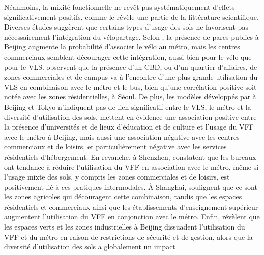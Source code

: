 \begin{refsegment}
Néanmoins, la mixité fonctionnelle ne revêt pas systématiquement d'effets significativement positifs, comme le révèle une partie de la littérature scientifique. Diverses études suggèrent que certains types d'usage des sols ne favorisent pas nécessairement l'intégration du vélopartage. Selon \textcolor{blue}{\textcite[56]{zhao_bicycle-metro_2017}}, la présence de parcs publics à Beijing augmente la probabilité d'associer le vélo au métro, mais les centres commerciaux semblent décourager cette intégration, aussi bien pour le vélo que pour le \acrshort{VLS}. \textcolor{blue}{\textcite[9]{kim_analysis_2021}} observent que la présence d'un \acrfull{CBD}, ou d'un quartier d'affaires, de zones commerciales et de campus va à l'encontre d'une plus grande utilisation du \acrshort{VLS} en combinaison avec le métro et le bus, bien qu'une corrélation positive soit notée avec les zones résidentielles, à Séoul. De plus, les modèles développés par \textcolor{blue}{\textcite[214]{lin_built_2018}} à Beijing et Tokyo n'indiquent pas de lien significatif entre le \acrshort{VLS}, le métro et la diversité d'utilisation des sols. \textcolor{blue}{\textcite[5]{zhou_spatially_2023}} mettent en évidence une association positive entre la présence d'universités et de lieux d'éducation et de culture et l'usage du \acrshort{VFF} avec le métro à Beijing, mais aussi une association négative avec les centres commerciaux et de loisirs, et particulièrement négative avec les services résidentiels d'hébergement. En revanche, à Shenzhen, \textcolor{blue}{\textcite[17]{guo_dockless_2021}} constatent que les bureaux ont tendance à réduire l'utilisation du \acrshort{VFF} en association avec le métro, même si l'usage mixte des sols, y compris les zones commerciales et de loisirs, est positivement lié à ces pratiques intermodales. À Shanghai, \textcolor{blue}{\textcite[9]{hu_examining_2022}} soulignent que ce sont les zones agricoles qui découragent cette combinaison, tandis que les espaces résidentiels et commerciaux ainsi que les établissements d'enseignement supérieur augmentent l'utilisation du \acrshort{VFF} en conjonction avec le métro. Enfin, \textcolor{blue}{\textcite[7]{liu_temporal_2022}} révèlent que les espaces verts et les zones industrielles à Beijing dissuadent l'utilisation du \acrshort{VFF} et du métro en raison de restrictions de sécurité et de gestion, alors que la diversité d'utilisation des sols a globalement un impact 
\end{refsegment}
